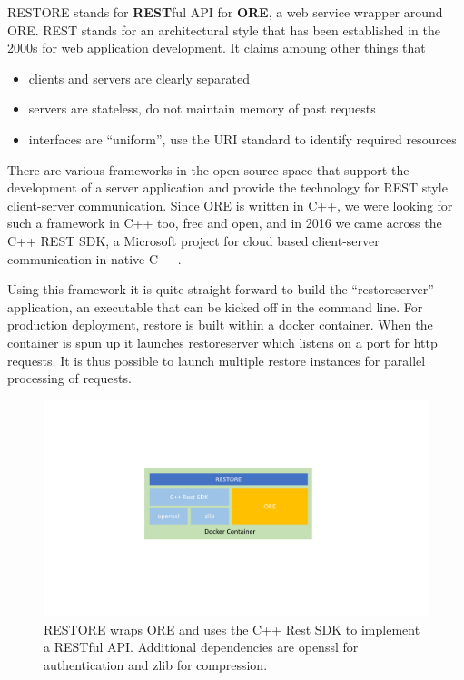 \documentclass[12pt, a4paper]{report}
\begin{document}
RESTORE stands for {\bf REST}ful API for {\bf ORE}, a web service wrapper around ORE.
REST stands for an architectural style that has been established in the 2000s for web application
development. It claims amoung other things that
\begin{itemize}
\item clients and servers are clearly separated
\item servers are stateless, do not maintain memory of past requests
\item interfaces are ``uniform'', use the URI standard to identify required resources
\end{itemize}
There are various frameworks in the open source space that support the development of a server application
and provide the technology for REST style client-server communication. Since ORE is written in C++, we were
looking for such a framework in C++ too, free and open, and in 2016 we came across the C++ REST SDK,
a Microsoft project for cloud based client-server communication in native C++. 

Using this framework it is quite straight-forward to build the ``restoreserver'' application, an executable
that can be kicked off in the command line. For production deployment, restore is built within a
{\rm docker container}. When the container is spun up it launches restoreserver which listens on a
port for http requests. It is thus possible to launch multiple restore instances for parallel processing
of requests.

\begin{figure}[h]
\begin{center}
\includegraphics[scale=0.6]{data/restore.pdf}
\end{center}
\caption{RESTORE wraps ORE and uses the C++ Rest SDK to implement a RESTful API. Additional dependencies
  are openssl for authentication and zlib for compression.}
\label{fig:restore}
\end{figure}
\end{document}

